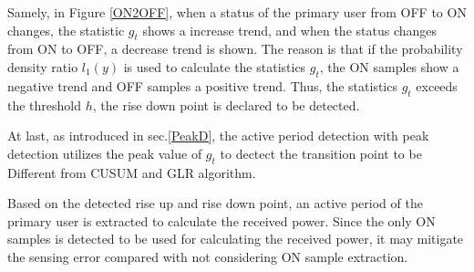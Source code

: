 Samely, in Figure \ref{ON2OFF}, when a status of the primary user from OFF to ON changes, the statistic $g_t$ shows a increase trend, and when the status changes from ON to OFF, a decrease trend is shown. The reason is that if the probability density ratio $l_1(y)$ is used to calculate the statistics $g_t$, the ON samples show a negative trend and OFF samples a positive trend. Thus, the statistics $g_t$ exceeds the threshold $h$, the rise down point is declared to be detected.

At last, as introduced in sec.\ref{PeakD}, the active period detection with peak detection utilizes the peak value of $g_t$ to dectect the transition point to be Different from CUSUM and GLR algorithm.

Based on the detected rise up and rise down point, an active period of the primary user is extracted to calculate the received power. Since the only ON samples is detected to be used for calculating the received power, it may mitigate the sensing error compared with not considering ON sample extraction.
